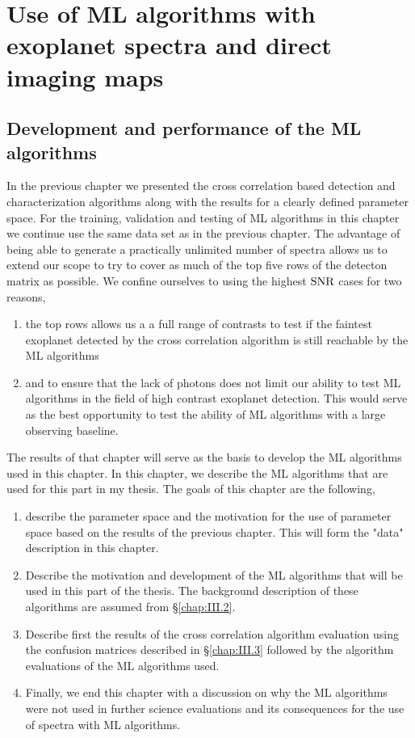 \part{Use of ML algorithms with exoplanet spectra and direct imaging maps}
\startcontents[chapters]
\printmyminitoc{}

\chapter{Development and performance of the ML algorithms}
\label{chap:III.5}
In the previous chapter we presented the cross correlation based detection and characterization algorithms along with the results for a clearly defined parameter space.
For the training, validation and testing of ML algorithms in this chapter we continue use the same data set as in the previous chapter.
The advantage of being able to generate a practically unlimited number of spectra allows us to extend our scope to try to cover as much of the top five rows of the detecton matrix as possible.
We confine ourselves to using the highest $\rm{SNR}$ cases for two reasons,
\begin{enumerate}
    \item the top rows allows us a a full range of contrasts to test if the faintest exoplanet detected by the cross correlation algorithm is still reachable by the ML algorithms
    \item and to ensure that the lack of photons does not limit our ability to test ML algorithms in the field of high contrast exoplanet detection.
    This would serve as the best opportunity to test the ability of ML algorithms with a large observing baseline.
\end{enumerate}
The results of that chapter will serve as the basis to develop the ML algorithms used in this chapter.
In this chapter, we describe the ML algorithms that are used for this part in my thesis. 
The goals of this chapter are the following,
\begin{enumerate}
    \item describe the parameter space and the motivation for the use of parameter space based on the results of the previous chapter. This will form the "data" description in this chapter.
    \item Describe the motivation and development of the ML algorithms that will be used in this part of the thesis. The background description of these algorithms are assumed from §\ref{chap:III.2}. 
    \item Describe first the results of the cross correlation algorithm evaluation using the confusion matrices described in §\ref{chap:III.3} followed by the algorithm evaluations of the ML algorithms used.
    \item Finally, we end this chapter with a discussion on why the ML algorithms were not used in further science evaluations and its consequences for the use of spectra with ML algorithms.
\end{enumerate}
